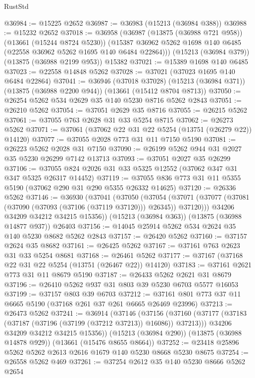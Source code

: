\begin{lexlean}{RustStd}
\begin{coremodule}
@36984 := @15225 @2652
@36987 := @36983 (@15213 (@36984 @388))
@36988 := @15232 @2652
@37018 := @36958
    (@36987
      (@13875 (@36988 @721 @958))
      (@13661 (@15244 @8724 @5230))
      (@15387 @36962 @5262 @1698 @140 @6485 (@22558 @36962 @5262 @1695 @140 @6484 @22864)))
    (@15213 (@36984 @379))
    (@13875 (@36988 @2199 @953))
    @15382
@37021 := @15389 @1698 @140 @6485
@37023 := @22558 @14848 @5262
@37028 := @37021 (@37023 @1695 @140 @6484 @22864)
@37041 := @36946
    (@37018 @37028)
    (@15213 (@36984 @371))
    (@13875 (@36988 @2200 @944))
    (@13661 (@15412 @8704 @8713))
@37050 := @26254 @5262 @534 @2629 @35 @140 @5230 @8716 @5262 @2843
@37051 := @26210 @5262
@37054 := @37051 @2629 @35 @8716
@37055 := @26215 @5262
@37061 := @37055 @763 @2628 @31 @33 @5254 @8715
@37062 := @26273 @5262
@37071 := @37061 (@37062 @22 @31 @22 @5254 (@13751 (@26279 @22)) @14120)
@37077 := @37055 @2028 @773 @31 @11 @7150 @5190
@37081 := @26223 @5262 @2028 @31 @7150
@37090 := @26199 @5262 @944 @31 @2027 @35 @5230 @26299 @7142 @13713
@37093 := @37051 @2027 @35 @26299
@37106 := @37055 @824 @2026 @31 @33 @5325 @12552 (@37062 @347 @31 @347 @5325 @26317 @14452)
@37119 := @37055 @836 @773 @31 @11 @5355 @5190 (@37062 @290 @31 @290 @5355 @26332 @14625)
@37120 := @26336 @5262
@37146 := @36930
    (@37041
      (@37050
        (@37054 (@37071 (@37077 (@37081 (@37090 (@37093 (@37106 (@37119 @37120))) @26345)) @37120)))
        @34206
        @34209
        @34212
        @34215
        @15356))
    (@15213 (@36984 @363))
    (@13875 (@36988 @14877 @937))
    @26403
@37156 := @14045 @25914 @5262 @534 @2624 @35 @140 @5230 @8682 @5262 @2843
@37157 := @26420 @5262
@37160 := @37157 @2624 @35 @8682
@37161 := @26425 @5262
@37167 := @37161 @763 @2623 @31 @33 @5254 @8681
@37168 := @26461 @5262
@37177 := @37167 (@37168 @22 @31 @22 @5254 (@13751 (@26467 @22)) @14120)
@37183 := @37161 @2621 @773 @31 @11 @8679 @5190
@37187 := @26433 @5262 @2621 @31 @8679
@37196 := @26410 @5262 @937 @31 @803 @39 @5230 @6703 @5577 @16053
@37199 := @37157 @803 @39 @6703
@37212 := @37161 @801 @773 @37 @11 @6665 @5190 (@37168 @261 @37 @261 @6665 @26469 @23996)
@37213 := @26473 @5262
@37241 := @36914
    (@37146
      (@37156
        (@37160 (@37177 (@37183 (@37187 (@37196 (@37199 (@37212 @37213)) @16086)) @37213)))
        @34206
        @34209
        @34212
        @34215
        @15356))
    (@15213 (@36984 @290))
    (@13875 (@36988 @14878 @929))
    (@13661 (@15476 @8655 @8664))
@37252 := @23418 @25896 @5262 @5262 @2613 @2616 @1679 @140 @5230 @8668 @5230 @8675
@37254 := @26558 @5262 @469
@37261 := @37254 @2612 @35 @140 @5230 @8666 @5262 @2654

\end{coremodule}
\end{lexlean}
